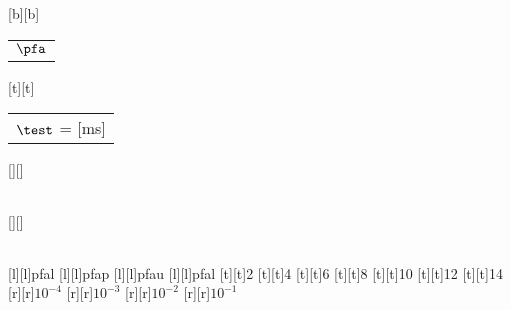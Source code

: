 %    
%
%
%
[b][b]{\color[rgb]{0,0,0}\setlength{\tabcolsep}{0pt}\begin{tabular}{c}$\pfa$\end{tabular}}%
[t][t]{\color[rgb]{0,0,0}\setlength{\tabcolsep}{0pt}\begin{tabular}{c}$\test$ = [ms]\end{tabular}}%
[][]{\color[rgb]{0,0,0}\setlength{\tabcolsep}{0pt}\begin{tabular}{c} \end{tabular}}%
[][]{\color[rgb]{0,0,0}\setlength{\tabcolsep}{0pt}\begin{tabular}{c} \end{tabular}}%
[l][l]{\color[rgb]{0,0,0}pfal}%
[l][l]{\color[rgb]{0,0,0}pfap}%
[l][l]{\color[rgb]{0,0,0}pfau}%
[l][l]{\color[rgb]{0,0,0}pfal}%
%
[t][t]{2}%
[t][t]{4}%
[t][t]{6}%
[t][t]{8}%
[t][t]{10}%
[t][t]{12}%
[t][t]{14}%
%
[r][r]{$10^{-4}$}%
[r][r]{$10^{-3}$}%
[r][r]{$10^{-2}$}%
[r][r]{$10^{-1}$}%
%
%
